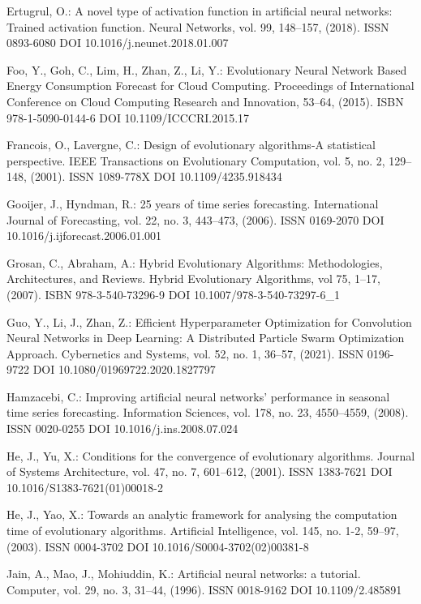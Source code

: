 \begin{thebibliography}{99.}
 Ertugrul, O.: A novel type of activation function in artificial neural networks: Trained activation function. Neural Networks, vol. 99, 148--157, (2018). ISSN 0893-6080 DOI 10.1016/j.neunet.2018.01.007

 Foo, Y., Goh, C., Lim, H., Zhan, Z., Li, Y.: Evolutionary Neural Network Based Energy Consumption Forecast for Cloud Computing. Proceedings of International Conference on Cloud Computing Research and Innovation, 53--64, (2015). ISBN 978-1-5090-0144-6 DOI 10.1109/ICCCRI.2015.17

 Francois, O., Lavergne, C.: Design of evolutionary algorithms-A statistical perspective. IEEE Transactions on Evolutionary Computation, vol. 5, no. 2, 129--148, (2001). ISSN 1089-778X DOI 10.1109/4235.918434

 Gooijer, J., Hyndman, R.: 25 years of time series forecasting. International Journal of Forecasting, vol. 22, no. 3, 443--473, (2006). ISSN 0169-2070 DOI 10.1016/j.ijforecast.2006.01.001

 Grosan, C., Abraham, A.: Hybrid Evolutionary Algorithms: Methodologies, Architectures, and Reviews. Hybrid Evolutionary Algorithms, vol 75, 1--17, (2007). ISBN 978-3-540-73296-9 DOI 10.1007/978-3-540-73297-6\_1

 Guo, Y., Li, J., Zhan, Z.: Efficient Hyperparameter Optimization for Convolution Neural Networks in Deep Learning: A Distributed Particle Swarm Optimization Approach. Cybernetics and Systems, vol. 52, no. 1, 36--57, (2021). ISSN 0196-9722 DOI 10.1080/01969722.2020.1827797

 Hamzacebi, C.: Improving artificial neural networks’ performance in seasonal time series forecasting. Information Sciences, vol. 178, no. 23, 4550--4559, (2008). ISSN 0020-0255 DOI 10.1016/j.ins.2008.07.024

 He, J., Yu, X.: Conditions for the convergence of evolutionary algorithms. Journal of Systems Architecture, vol. 47, no. 7, 601--612, (2001). ISSN 1383-7621 DOI 10.1016/S1383-7621(01)00018-2

 He, J., Yao, X.: Towards an analytic framework for analysing the computation time of evolutionary algorithms. Artificial Intelligence, vol. 145, no. 1-2, 59--97, (2003). ISSN 0004-3702 DOI 10.1016/S0004-3702(02)00381-8

 Jain, A., Mao, J., Mohiuddin, K.: Artificial neural networks: a tutorial. Computer, vol. 29, no. 3, 31--44, (1996). ISSN 0018-9162 DOI 10.1109/2.485891


\end{thebibliography}

